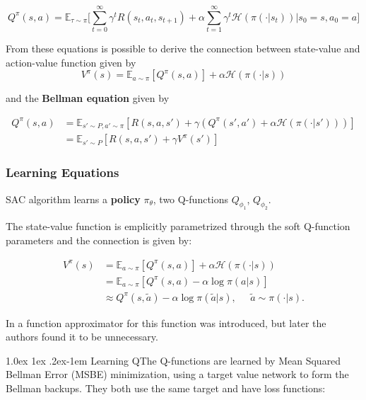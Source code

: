 \documentclass[a4paper, 11pt]{article}
\makeatletter
\renewcommand{\paragraph}{%
	\@startsection{paragraph}{4}%
	{\z@}{1.0ex \@plus 1ex \@minus .2ex}{-1em}%
	{\normalfont\normalsize\bfseries}%
}
\makeatother
\begin{document}
	\begin{equation} \label{eq4:action_value}
	Q^\pi(s,a) = \mathbb{E}_{\tau \sim \pi}\Bigg[\sum_{t=0}^{\infty} \gamma^t R(s_t, a_t, s_{t+1}) + \alpha \sum_{t=1}^{\infty} \gamma^t \mathcal{H}(\pi(\cdot|s_t))\bigg|s_0 = s, a_0 =a\Bigg]
	\end{equation}	
	
	From these equations is possible to derive the connection between state-value and action-value function given by
	\begin{equation} \label{eq5:q_v_relation}
	V^\pi(s) = \mathbb{E}_{a\sim\pi}[Q^\pi(s,a)] + \alpha \mathcal{H}(\pi(\cdot|s))
	\end{equation}
	
	and the \textbf{Bellman equation} given by

	\begin{align} 	\label{eq6:bellman}
	Q^\pi(s,a) &= \mathbb{E}_{s'\sim P, a'\sim\pi}[R(s,a,s') + \gamma(Q^\pi(s',a') + \alpha \mathcal{H}(\pi(\cdot|s')))]\\
	&= \mathbb{E}_{s'\sim P}[R(s,a,s') + \gamma V^\pi(s')]
	\end{align}
	
	\subsubsection{Learning Equations}
	SAC algorithm learns a \textbf{policy} $\pi_\theta$, two Q-functions $Q_{\phi_1}$,  $Q_{\phi_2}$.
	
	The state-value function is emplicitly parametrized through the soft Q-function parameters and the connection is given by:
	
	\begin{align}
	V^{\pi}(s) &= \mathbb{E}_{a \sim \pi}[Q^{\pi}(s,a)] + \alpha \mathcal{H} \left(\pi(\cdot|s)\right) \\
	&= \mathbb{E}_{a \sim \pi}[Q^{\pi}(s,a) - \alpha \log \pi(a|s)] \\
	& \approx Q^{\pi}(s,\tilde{a}) - \alpha \log \pi(\tilde{a}|s), \;\;\;\;\; \tilde{a} \sim \pi(\cdot|s).	
	\end{align}
	
	In \cite{haarnoja2018soft} a function approximator for this function was introduced, but later \cite{haarnoja2018alg} the authors found it to be unnecessary.
	
	\paragraph{Learning Q}The Q-functions are learned by Mean Squared Bellman Error (MSBE) minimization, using a target value network to form the Bellman backups. They both use the same target and have loss functions:
	
\end{document}
